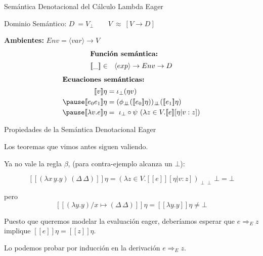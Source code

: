 \documentclass[handout]{beamer}
\newcommand{\se}[1]{\mbox{$[\![#1]\!]$}}
\begin{document}
\begin{frame}{Semántica Denotacional del Cálculo Lambda Eager}

Dominio Semántico: $D \ = V_\perp \qquad  V\ \approx\ [V\rightarrow D]$
\pause

\bigskip

\textbf{Ambientes:} $Env = \langle var\rangle\rightarrow V$
\pause
\bigskip
\begin{align*}
  \shortintertext{\textbf{Función semántica:}}
  \se{\_}\in\ \ \langle exp\rangle \rightarrow Env\rightarrow D
\end{align*}
\pause
\vspace{-4ex}
\begin{align*}
\shortintertext{\textbf{Ecuaciones semánticas:}}
  \se{v}\eta &= \iota_\perp (\eta v)\\
  \pause
  \se{e_0 e_1}\eta &= (\phi_{\perp\!\!\!\perp}(\se{e_0}\eta))_{\perp\!\!\!\perp} (\se{e_1}\eta)\\
  \pause
  \se{\lambda v.e}\eta &=\  \iota_\perp\circ\psi\ (\lambda z\in V. \se{e}[\eta|v:z])
\end{align*}
\end{frame}

\begin{frame}{Propiedades de la Semántica Denotacional Eager }

Los teoremas que vimos antes siguen valiendo. 
\pause

\bigskip

Ya no vale la regla $\beta$, (para contra-ejemplo alcanza un $\bot$):

\bigskip

\[\se{(\lambda x\,y.y)\,(\Delta\,\Delta)}\eta = (\lambda z\in V. \se{e}[\eta|v:z])_{\perp\!\!\!\perp}\, \bot = \bot\]

\medskip
pero
\[\se{(\lambda y.y)/x \mapsto(\Delta\,\Delta)}\eta = \se{\lambda y.y}\eta \neq \bot\]

\medskip

\pause Puesto que queremos modelar la evaluación eager, deberíamos
esperar que $e \Rightarrow_E z$ implique $\se{e}\eta = \se{z}\eta$.
\bigskip

Lo podemos probar por inducción en la derivación $e \Rightarrow_E z$.


\end{frame}
\end{document}
